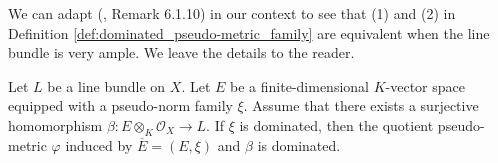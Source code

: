\documentclass [11pt,reqno]{amsart}
\newcommand{\1}{\mathmybb{1}}
\def\cO{{\mathcal{O}}}
\begin{document}
\begin{remark}
\label{rem:CM_6.1.10} We can adapt (\cite{ChenMori}, Remark 6.1.10) in our context to see that (1) and (2) in Definition \ref{def:dominated_pseudo-metric_family} are equivalent when the line bundle is very ample. We leave the details to the reader.

\end{remark}

\begin{proposition}
\label{prop:quotient_pseudo-metric_family_dominated}
Let $L$ be a line bundle on $X$. Let $E$ be a finite-dimensional $K$-vector space equipped with a pseudo-norm family $\xi$. Assume that there exists a surjective homomorphism $\beta: E\otimes_{K}\cO_{X} \to L$. If $\xi$ is dominated, then the quotient pseudo-metric $\varphi$ induced by $\overline{E}=(E,\xi)$ and $\beta$ is dominated.
\end{proposition}
\end{document}
